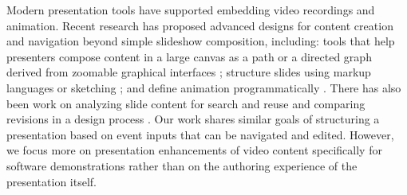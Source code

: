 
Modern presentation tools have supported embedding video recordings and animation. Recent research has proposed advanced designs for content creation and navigation beyond simple slideshow composition, including: tools that help presenters compose content in a large canvas \cite{Good:2002:ZUI:941231.941236} as a path \cite{Lichtschlag:2009:FTA:1518701.1518786} or a directed graph \cite{Spicer:2012:NAD:2379790.2379795} derived from zoomable graphical interfaces \cite{Bederson:1994:PZG:192426.192435}; structure slides using markup languages \cite{Edge:2013:HDP:2470654.2470749} or sketching \cite{Li:2003:SIP:958432.958476}; and define animation programmatically \cite{Zongker:2003:CAP:846276.846319}. There has also been work on analyzing slide content for search and reuse \cite{Bergman:2010:OWP:1719970.1719999,Sharmin:2012:SCC:2166966.2166992} and comparing revisions in a design process \cite{Drucker:2006:CMM:1166253.1166263}. Our work shares similar goals of structuring a presentation based on event inputs that can be navigated and edited. However, we focus more on presentation enhancements of video content specifically for software demonstrations rather than on the authoring experience of the presentation itself.

